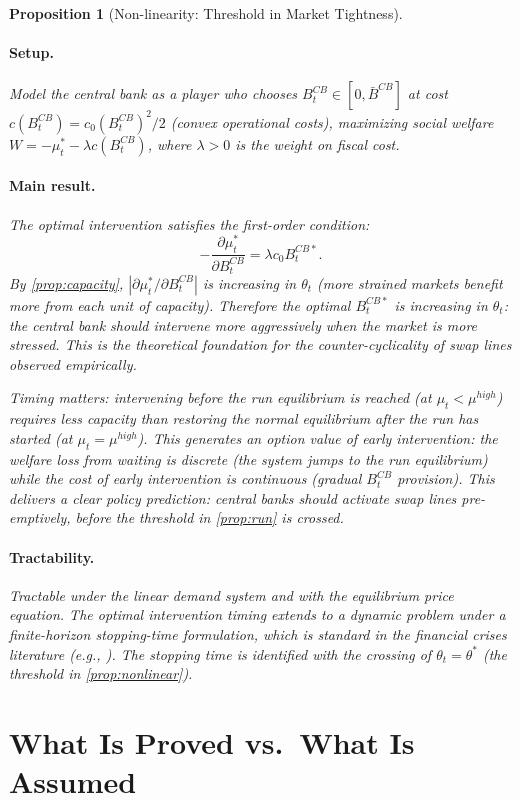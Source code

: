 \documentclass[12pt]{article}
\newtheorem{proposition}{Proposition}
\theoremstyle{definition}
\newcommand{\1}[1]{\mathds{1}\left[#1\right]}
\begin{document}
\begin{proposition}[Non-linearity: Threshold in Market Tightness]
\paragraph{Setup.} Model the central bank as a player who chooses $B_t^{CB}
\in [0, \bar{B}^{CB}]$ at cost $c(B_t^{CB}) = c_0 (B_t^{CB})^2/2$ (convex
operational costs), maximizing social welfare $W = -\mu_t^* - \lambda
c(B_t^{CB})$, where $\lambda > 0$ is the weight on fiscal cost.

\paragraph{Main result.} The optimal intervention satisfies the first-order
condition:
\[
  -\frac{\partial\mu_t^*}{\partial B_t^{CB}} = \lambda c_0 B_t^{CB*}.
\]
By \cref{prop:capacity}, $|\partial\mu_t^*/\partial B_t^{CB}|$ is increasing
in $\theta_t$ (more strained markets benefit more from each unit of capacity).
Therefore the optimal $B_t^{CB*}$ is increasing in $\theta_t$: the central
bank should intervene more aggressively when the market is more stressed. This
is the theoretical foundation for the counter-cyclicality of swap lines
observed empirically.

Timing matters: intervening before the run equilibrium is reached (at $\mu_t
< \mu^{high}$) requires less capacity than restoring the normal equilibrium
after the run has started (at $\mu_t = \mu^{high}$). This generates an
\emph{option value of early intervention}: the welfare loss from waiting is
discrete (the system jumps to the run equilibrium) while the cost of early
intervention is continuous (gradual $B_t^{CB}$ provision). This delivers a
clear policy prediction: central banks should activate swap lines
pre-emptively, before the threshold in \cref{prop:run} is crossed.

\paragraph{Tractability.} Tractable under the linear demand system and with
the equilibrium price equation. The optimal intervention timing extends to a
dynamic problem under a finite-horizon stopping-time formulation, which is
standard in the financial crises literature (e.g., \citealt{DiasCosta2020}).
The stopping time is identified with the crossing of $\theta_t = \theta^*$
(the threshold in \cref{prop:nonlinear}).

\section{What Is Proved vs.\ What Is Assumed}
\label{sec:summary}


\end{proposition}
\end{document}
